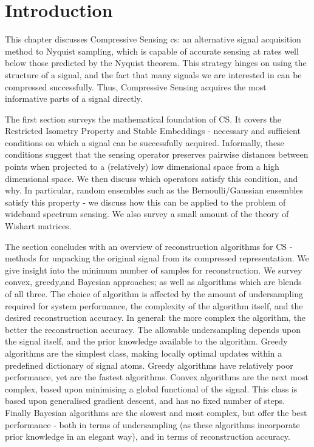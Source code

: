 \section{Introduction} \label{sec:csinto}

This chapter discusses Compressive Sensing \gls{cs}: an alternative signal acquisition method to Nyquist sampling, which is capable of accurate sensing at rates well below those predicted by the Nyquist theorem. This strategy hinges on using the structure of a signal, and the fact that many signals we are interested in can be compressed successfully. Thus, Compressive Sensing acquires the most informative parts of a signal directly. 

The first section surveys the mathematical foundation of CS. It covers the Restricted Isometry Property and Stable Embeddings - necessary and sufficient conditions on which a signal can be successfully acquired. Informally, these conditions suggest that the sensing operator preserves pairwise distances between points when projected to a (relatively) low dimensional space from a high dimensional space. We then discuss which operators satisfy this condition, and why. In particular, random ensembles such as the Bernoulli/Gaussian ensembles satisfy this property - we discuss how this can be applied to the problem of wideband spectrum sensing. We also survey a small amount of the theory of Wishart matrices.

The section concludes with an overview of reconstruction algorithms for CS - methods for unpacking the original signal from its compressed representation. We give insight into the minimum number of samples for reconstruction. We survey convex, greedy,and Bayesian approaches; as well as algorithms which are blends of all three. The choice of algorithm is affected by the amount of undersampling required for system performance, the complexity of the algorithm itself, and the desired reconstruction accuracy. In general: the more complex the algorithm, the better the reconstruction accuracy. The allowable undersampling depends upon the signal itself, and the prior knowledge available to the algorithm. Greedy algorithms are the simplest class, making locally optimal updates within a predefined dictionary of signal atoms. Greedy algorithms have relatively poor performance, yet are the fastest algorithms. Convex algorithms are the next most complex, based upon minimising a global functional of the signal. This class is based upon generalised gradient descent, and has no fixed number of steps. Finally Bayesian algorithms are the slowest and most complex, but offer the best performance - both in terms of undersampling (as these algorithms incorporate prior knowledge in an elegant way), and in terms of reconstruction accuracy. 

